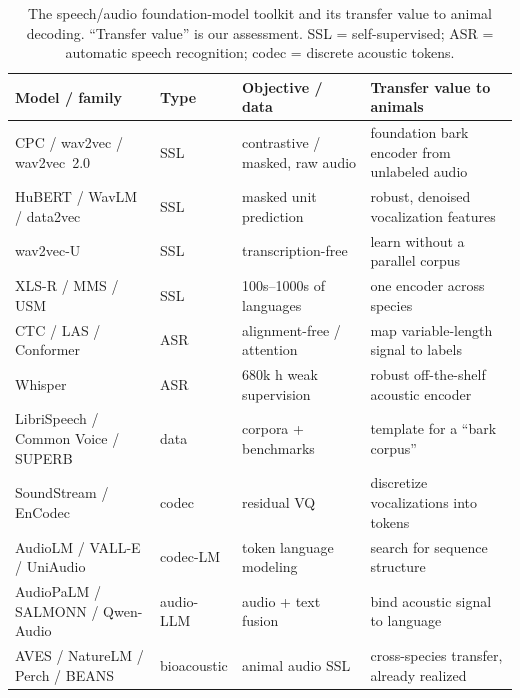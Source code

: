 \begin{table}[htbp]
\centering
\caption{The speech/audio foundation-model toolkit and its transfer value to
animal decoding. ``Transfer value'' is our assessment. SSL = self-supervised;
ASR = automatic speech recognition; codec = discrete acoustic tokens.}
\label{tab:audio}
\small
\setlength{\tabcolsep}{4pt}
\begin{tabular}{@{}p{3.0cm}p{1.8cm}p{3.4cm}p{5.1cm}@{}}
\toprule
\textbf{Model / family} & \textbf{Type} & \textbf{Objective / data} & \textbf{Transfer value to animals} \\
\midrule
CPC / wav2vec / wav2vec~2.0~\cite{vandenoord2018cpc,schneider2019wav2vec,baevski2020wav2vec2} & SSL & contrastive / masked, raw audio & foundation bark encoder from unlabeled audio \\
HuBERT / WavLM / data2vec~\cite{hsu2021hubert,chen2022wavlm,baevski2022data2vec,baevski2023data2vec2} & SSL & masked unit prediction & robust, denoised vocalization features \\
wav2vec-U~\cite{baevski2021wav2vecu} & SSL & transcription-free & learn without a parallel corpus \\
XLS-R / MMS / USM~\cite{babu2022xlsr,pratap2023mms,zhang2023usm} & SSL & 100s--1000s of languages & one encoder across species \\
CTC / LAS / Conformer~\cite{graves2006ctc,chan2016las,gulati2020conformer} & ASR & alignment-free / attention & map variable-length signal to labels \\
Whisper~\cite{radford2023whisper} & ASR & 680k h weak supervision & robust off-the-shelf acoustic encoder \\
LibriSpeech / Common Voice / SUPERB~\cite{panayotov2015librispeech,ardila2020commonvoice,yang2021superb} & data & corpora + benchmarks & template for a ``bark corpus'' \\
SoundStream / EnCodec~\cite{zeghidour2021soundstream,defossez2022encodec} & codec & residual VQ & discretize vocalizations into tokens \\
AudioLM / VALL-E / UniAudio~\cite{borsos2023audiolm,wang2023valle,yang2024uniaudio} & codec-LM & token language modeling & search for sequence structure \\
AudioPaLM / SALMONN / Qwen-Audio~\cite{rubenstein2023audiopalm,tang2024salmonn,chu2024qwenaudio} & audio-LLM & audio + text fusion & bind acoustic signal to language \\
AVES / NatureLM / Perch / BEANS~\cite{hagiwara2023aves,robinson2024naturelm,ghani2023perch,hagiwara2023beans} & bioacoustic & animal audio SSL & cross-species transfer, already realized \\
\bottomrule
\end{tabular}
\end{table}